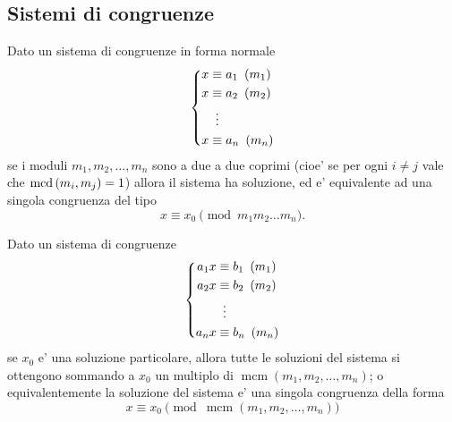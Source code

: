 \subsection{Sistemi di congruenze}

\begin{theorem}
    Dato un sistema di congruenze in forma normale 
    \begin{equation*}
        \left\{
        \begin{alignedat}{1}
            x&\equiv a_1 \Mod{m_1}\\
            x&\equiv a_2 \Mod{m_2}\\
            &\vdotswithin{\equiv} \\
            x&\equiv a_n \Mod{m_n}
        \end{alignedat}      
        \right . 
    \end{equation*}
    se i moduli $m_1, m_2, \dots, m_n$ sono a due a due coprimi (cioe' se per ogni $i \neq j$ vale che $\operatorname{mcd}\left(m_i, m_j\right) = 1$) allora il sistema ha soluzione, ed e' equivalente ad una singola congruenza del tipo
    \begin{equation}
        x \equiv x_0 \pmod{m_1 m_2 \dots m_n}.
    \end{equation} 
\end{theorem}

\begin{proposition}
    Dato un sistema di congruenze 
    \begin{equation*}
        \left\{
        \begin{alignedat}{1}
            a_1x &\equiv b_1 \Mod{m_1}\\
            a_2x &\equiv b_2 \Mod{m_2}\\
            &\vdotswithin{\equiv} \\
            a_nx &\equiv b_n \Mod{m_n}
        \end{alignedat}      
        \right . 
    \end{equation*}
    se $x_0$ e' una soluzione particolare, allora tutte le soluzioni del sistema si ottengono sommando a $x_0$ un multiplo di $\operatorname{mcm}(m_1, m_2, \dots, m_n)$; o equivalentemente la soluzione del sistema e' una singola congruenza della forma
    \begin{equation}
        x \equiv x_0 \pmod{\operatorname{mcm}(m_1, m_2, \dots, m_n)}
    \end{equation}
\end{proposition}